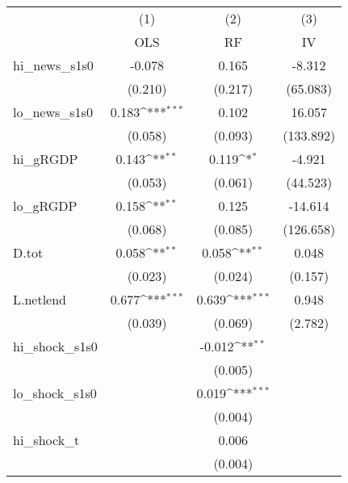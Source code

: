 {
\def\sym#1{\ifmmode^{#1}\else\(^{#1}\)\fi}
\begin{tabular}{l*{3}{c}}
\toprule
            &\multicolumn{1}{c}{(1)}&\multicolumn{1}{c}{(2)}&\multicolumn{1}{c}{(3)}\\
            &\multicolumn{1}{c}{OLS}&\multicolumn{1}{c}{RF}&\multicolumn{1}{c}{IV}\\
\midrule
hi\_news\_s1s0&      -0.078         &       0.165         &      -8.312         \\
            &     (0.210)         &     (0.217)         &    (65.083)         \\
\addlinespace
lo\_news\_s1s0&       0.183\sym{***}&       0.102         &      16.057         \\
            &     (0.058)         &     (0.093)         &   (133.892)         \\
\addlinespace
hi\_gRGDP    &       0.143\sym{**} &       0.119\sym{*}  &      -4.921         \\
            &     (0.053)         &     (0.061)         &    (44.523)         \\
\addlinespace
lo\_gRGDP    &       0.158\sym{**} &       0.125         &     -14.614         \\
            &     (0.068)         &     (0.085)         &   (126.658)         \\
\addlinespace
D.tot       &       0.058\sym{**} &       0.058\sym{**} &       0.048         \\
            &     (0.023)         &     (0.024)         &     (0.157)         \\
\addlinespace
L.netlend   &       0.677\sym{***}&       0.639\sym{***}&       0.948         \\
            &     (0.039)         &     (0.069)         &     (2.782)         \\
\addlinespace
hi\_shock\_s1s0&                     &      -0.012\sym{**} &                     \\
            &                     &     (0.005)         &                     \\
\addlinespace
lo\_shock\_s1s0&                     &       0.019\sym{***}&                     \\
            &                     &     (0.004)         &                     \\
\addlinespace
hi\_shock\_t  &                     &       0.006         &                     \\
            &                     &     (0.004)         &                     \\

\end{tabular}}
